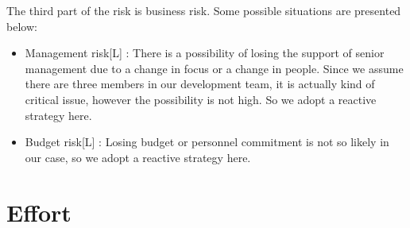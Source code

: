 \documentclass{article}
\begin{document}
The third part of the risk is business risk. Some possible situations are presented below:
\begin{itemize}
	\item Management risk[L] : There is a possibility of losing the support of senior management due to a change in focus or a change in people. Since we assume there are three members in our development team, it is actually kind of critical issue, however the possibility is not high. So we adopt a reactive strategy here.
	\item Budget risk[L] : Losing budget or personnel commitment is not so likely in our case, so we adopt a reactive strategy here.
\end{itemize}


\newpage

\section{Effort}
\end{document}
